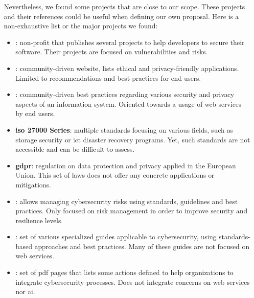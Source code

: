 Nevertheless, we found some projects that are close to our scope. These projects and their references could be useful when defining our own proposal. Here is a non-exhaustive list or the major projects we found:
\begin{itemize}
    \item \textbf{}: non-profit that publishes several projects to help developers to secure their software. Their projects are focused on vulnerabilities and risks.
    \item \textbf{}: community-driven website, lists ethical and privacy-friendly applications. Limited to recommendations and best-practices for end users.
    \item \textbf{}: community-driven best practices regarding various security and privacy aspects of an information system. Oriented towards a usage of web services by end users.
    \item \textbf{\gls{iso} 27000 Series}: multiple standards focusing on various fields, such as storage security or \gls{ict} disaster recovery programs. Yet, such standards are not accessible and can be difficult to assess.
    \item \textbf{\gls{gdpr}}: regulation on data protection and privacy applied in the European Union. This set of laws does not offer any concrete applications or mitigations.
    \item \textbf{}: allows managing cybersecurity risks using standards, guidelines and best practices. Only focused on risk management in order to improve security and resilience levels.
    \item \textbf{}: set of various specialized guides applicable to cybersecurity, using standards-based approaches and best practices. Many of these guides are not focused on web services.
    \item \textbf{}: set of \gls{pdf} pages that lists some actions defined to help organizations to integrate cybersecurity processes. Does not integrate concerns on web services nor \gls{ai}.
\end{itemize}

